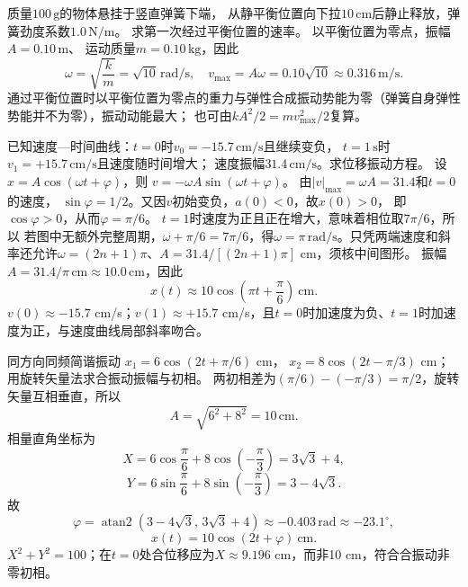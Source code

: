\problemtext 质量$100\,\mathrm g$的物体悬挂于竖直弹簧下端，
从静平衡位置向下拉$10\,\mathrm{cm}$后静止释放，弹簧劲度系数$1.0\,\mathrm{N/m}$。
求第一次经过平衡位置的速率。
\workings
以平衡位置为零点，振幅$A=0.10\,\mathrm m$、
运动质量$m=0.10\,\mathrm{kg}$，因此
\[
\omega=\sqrt{\frac{k}{m}}=\sqrt{10}\,\mathrm{rad/s},\quad
\boxed{v_{\max}=A\omega=0.10\sqrt{10}\approx0.316\,\mathrm{m/s}}.
\]
\crosscheck 通过平衡位置时以平衡位置为零点的重力与弹性合成振动势能为零（弹簧自身弹性势能并不为零），振动动能最大；
也可由$kA^2/2=mv_{\max}^2/2$复算。

\problemtext 已知速度—时间曲线：$t=0$时$v_0=-15.7\,\mathrm{cm/s}$且继续变负，
$t=1\,\mathrm s$时$v_1=+15.7\,\mathrm{cm/s}$且速度随时间增大；
速度振幅$31.4\,\mathrm{cm/s}$。求位移振动方程。
\workings
设$x=A\cos(\omega t+\varphi)$，则
$v=-\omega A\sin(\omega t+\varphi)$。
由$|v|_{\max}=\omega A=31.4$和$t=0$的速度，
$\sin\varphi=1/2$。又因$v$初始变负，$a(0)<0$，故$x(0)>0$，
即$\cos\varphi>0$，从而$\varphi=\pi/6$。
$t=1$时速度为正且正在增大，意味着相位取$7\pi/6$，所以
若图中无额外完整周期，$\omega+\pi/6=7\pi/6$，得$\omega=\pi\,\mathrm{rad/s}$。只凭两端速度和斜率还允许$\omega=(2n+1)\pi$、$A=31.4/[(2n+1)\pi]$ cm，须核中间图形。
振幅$A=31.4/\pi\,\mathrm{cm}\approx10.0\,\mathrm{cm}$，因此
\[
\boxed{x(t)\approx10\cos\left(\pi t+\frac{\pi}{6}\right)\ \mathrm{cm}}.
\]
\crosscheck $v(0)\approx-15.7$ cm/s；$v(1)\approx+15.7$ cm/s，且$t=0$时加速度为负、$t=1$时加速度为正，与速度曲线局部斜率吻合。

\problemtext 同方向同频简谐振动
$x_1=6\cos(2t+\pi/6)$ cm，
$x_2=8\cos(2t-\pi/3)$ cm；
用旋转矢量法求合振动振幅与初相。
\workings
两初相差为$(\pi/6)-(-\pi/3)=\pi/2$，旋转矢量互相垂直，所以
\[
\boxed{A=\sqrt{6^2+8^2}=10\,\mathrm{cm}}.
\]
相量直角坐标为
\[
X=6\cos\frac{\pi}{6}+8\cos\left(-\frac{\pi}{3}\right)
=3\sqrt3+4,
\]
\[
Y=6\sin\frac{\pi}{6}+8\sin\left(-\frac{\pi}{3}\right)
=3-4\sqrt3.
\]
故
\[
\boxed{\varphi=\operatorname{atan2}(3-4\sqrt3,\,3\sqrt3+4)
\approx-0.403\,\mathrm{rad}\approx-23.1^\circ},
\]
\[
\boxed{x(t)=10\cos(2t+\varphi)\ \mathrm{cm}}.
\]
\crosscheck $X^2+Y^2=100$；在$t=0$处合位移应为$X\approx9.196$ cm，而非10 cm，符合合振动非零初相。
